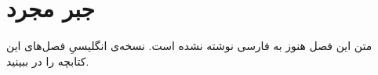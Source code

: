 \chapter{جبر مجرد}
\label{ch:04-abstract-algebra-fa-01}

متن این فصل هنوز به فارسی نوشته نشده است. نسخه‌ی انگلیسیِ فصل‌های این کتابچه را در  ببینید.
